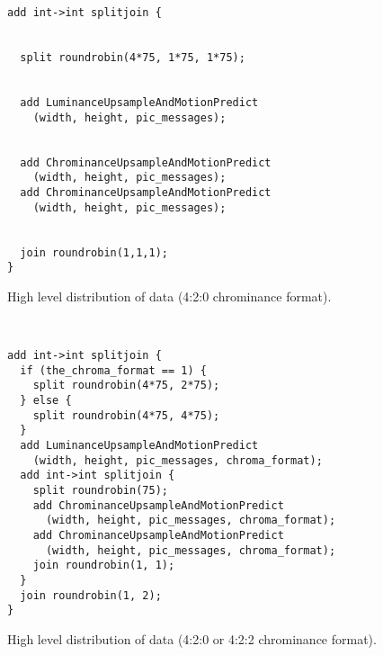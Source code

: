 \begin{figure*}[t]
  \begin{minipage}[t]{4.0in}
    {
  \begin{scriptsize}
    \begin{verbatim}
add int->int splitjoin {


  split roundrobin(4*75, 1*75, 1*75);
  

  add LuminanceUpsampleAndMotionPredict
    (width, height, pic_messages);
  

  add ChrominanceUpsampleAndMotionPredict
    (width, height, pic_messages);
  add ChrominanceUpsampleAndMotionPredict
    (width, height, pic_messages);
  

  join roundrobin(1,1,1);  
}
 	  \end{verbatim}
	\end{scriptsize}
    }
    \caption{High level distribution of data (4:2:0 chrominance format).}
    \label{chroma_original}
  \end{minipage}
  ~~\vrule~~
  \begin{minipage}[t]{3.0in}
    {  
	\begin{scriptsize}
	  \begin{verbatim}
add int->int splitjoin {
  if (the_chroma_format == 1) {
    split roundrobin(4*75, 2*75);
  } else {
    split roundrobin(4*75, 4*75);
  }
  add LuminanceUpsampleAndMotionPredict
    (width, height, pic_messages, chroma_format);
  add int->int splitjoin {
    split roundrobin(75);
    add ChrominanceUpsampleAndMotionPredict
      (width, height, pic_messages, chroma_format);  
    add ChrominanceUpsampleAndMotionPredict
      (width, height, pic_messages, chroma_format);  
    join roundrobin(1, 1);
  }
  join roundrobin(1, 2);
}
	  \end{verbatim}
	\end{scriptsize}
    }
    \caption{High level distribution of data (4:2:0 or 4:2:2 chrominance format).}
    \label{chroma_modified}
  \end{minipage}
\end{figure*}









